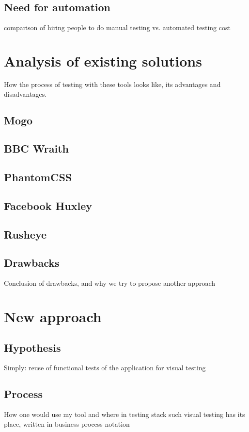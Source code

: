 \documentclass[11pt,oneside,final]{fithesis2}
\begin{document}
  \section{Need for automation}
  comparison of hiring people to do manual testing vs. automated testing cost
    
\chapter{Analysis of existing solutions}
How the process of testing with these tools looks like, its advantages and disadvantages.
  
  \section{Mogo}
  
  \section{BBC Wraith}
  
  \section{PhantomCSS}
  
  \section{Facebook Huxley}
  
  \section{Rusheye}
  
  \section{Drawbacks}
  Conclusion of drawbacks, and why we try to propose another approach
  
\chapter{New approach}
  
  \section{Hypothesis}
  Simply: reuse of functional tests of the application for visual testing
  
  \section{Process}
  How one would use my tool and where in testing stack such visual testing has its place, written in business process notation
  
\end{document}
